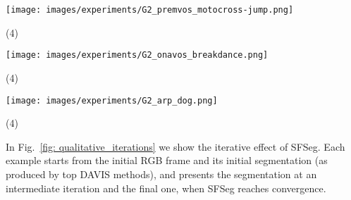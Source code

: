 \documentclass{article}
\begin{document}
\begin{figure*}[!t]
     \begin{minipage}[t]{0.32\linewidth}
     \raggedright
        \texttt{[image: images/experiments/G2\_premvos\_motocross-jump.png]}
        \vspace*{-2mm}
        \begin{tasks}(4)
          \task[Input]
          \task[SFSeg]
          \task[GT]
        \end{tasks}
	\end{minipage}
	\begin{minipage}[t]{0.32\linewidth}
	\centering
        \texttt{[image: images/experiments/G2\_onavos\_breakdance.png]}
        \vspace*{-2mm}
        \begin{tasks}(4)
          \task[Input]
          \task[SFSeg]
          \task[GT]
        \end{tasks}
	\end{minipage}
  	\begin{minipage}[t]{0.32\linewidth}
  	\raggedleft
         \texttt{[image: images/experiments/G2\_arp\_dog.png]}
        \vspace*{-2mm}
        \begin{tasks}(4)
          \task[Input]
          \task[SFSeg]
          \task[GT]
        \end{tasks}
	\end{minipage}
	\caption{We show the output of SFSeg (col 3) over the input masks (col 2) received from top DAVIS-2016 solutions in various video frames (col 1). We see how the quality of the masks is increasing, bringing the input masks closer to ground truth (col 4). 1. PReMVOS -  place on semi-supervised (motocross-jump); 2. OnAVOS   -  place on semi-supervised (breakdance); 3. ARP -  place on unsupervised (dog).}
	\label{fig: qualitative_hard}
\end{figure*}
In Fig.~\ref{fig: qualitative_iterations} we show the iterative effect of SFSeg. Each example starts from the initial RGB frame and its initial segmentation (as produced by top DAVIS methods), and presents the segmentation at an intermediate iteration and the final one, when SFSeg reaches convergence.
\end{document}
